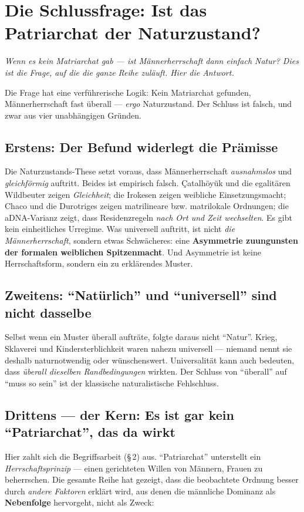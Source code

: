 \documentclass[11pt,a4paper,ngerman]{scrartcl}
\newcommand{\chipbase}[2]{\hspace{0pt}{\footnotesize\textcolor{#1}{[\textsc{#2}]}}}
\newcommand{\chipbelegt}[1]{\chipbase{chipgreen}{#1}}
\begin{document}
\section{Die Schlussfrage: Ist das Patriarchat der Naturzustand?}
\noindent\textit{Wenn es kein Matriarchat gab --- ist Männerherrschaft dann einfach Natur? Dies ist die Frage, auf die die ganze Reihe zuläuft. Hier die Antwort.}
\medskip

Die Frage hat eine verführerische Logik: Kein Matriarchat gefunden, Männerherrschaft fast überall --- \emph{ergo} Naturzustand. Der Schluss ist falsch, und zwar aus vier unabhängigen Gründen.

\subsection*{Erstens: Der Befund widerlegt die Prämisse}
Die Naturzustands-These setzt voraus, dass Männerherrschaft \emph{ausnahmslos} und \emph{gleichförmig} auftritt. Beides ist empirisch falsch. Çatalhöyük und die egalitären Wildbeuter zeigen \emph{Gleichheit}; die Irokesen zeigen weibliche Einsetzungsmacht; Chaco und die Durotriges zeigen matrilineare bzw. matrilokale Ordnungen; die aDNA-Varianz zeigt, dass Residenzregeln \emph{nach Ort und Zeit wechselten}. Es gibt kein einheitliches Urregime. Was universell auftritt, ist nicht \emph{die Männerherrschaft}, sondern etwas Schwächeres: eine \textbf{Asymmetrie zuungunsten der formalen weiblichen Spitzenmacht}. Und Asymmetrie ist keine Herrschaftsform, sondern ein zu erklärendes Muster. \chipbelegt{belegt}

\subsection*{Zweitens: \enquote{Natürlich} und \enquote{universell} sind nicht dasselbe}
Selbst wenn ein Muster überall aufträte, folgte daraus nicht \enquote{Natur}. Krieg, Sklaverei und Kindersterblichkeit waren nahezu universell --- niemand nennt sie deshalb naturnotwendig oder wünschenswert. Universalität kann auch bedeuten, dass \emph{überall dieselben Randbedingungen} wirkten. Der Schluss von \enquote{überall} auf \enquote{muss so sein} ist der klassische naturalistische Fehlschluss. \chipbelegt{belegt}

\subsection*{Drittens --- der Kern: Es ist gar kein \enquote{Patriarchat}, das da wirkt}
Hier zahlt sich die Begriffsarbeit (§\,2) aus. \enquote{Patriarchat} unterstellt ein \emph{Herrschaftsprinzip} --- einen gerichteten Willen von Männern, Frauen zu beherrschen. Die gesamte Reihe hat gezeigt, dass die beobachtete Ordnung besser durch \emph{andere Faktoren} erklärt wird, aus denen die männliche Dominanz als \textbf{Nebenfolge} hervorgeht, nicht als Zweck:
\end{document}
